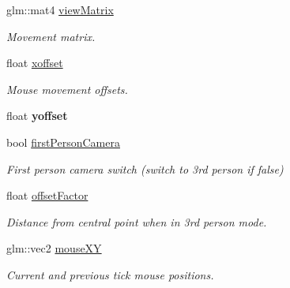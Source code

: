 \begin{DoxyCompactItemize}
\mbox{\label{class_camera_component_aa9ba12dfc1a9b7b06bf79fdb0a91a3e2}} 
glm\+::mat4 \mbox{\hyperlink{class_camera_component_aa9ba12dfc1a9b7b06bf79fdb0a91a3e2}{view\+Matrix}}
\begin{DoxyCompactList}\small\item\em Movement matrix. \end{DoxyCompactList}\item 
\mbox{\label{class_camera_component_a385f35e4c5d616580e0bd4ded5c4653f}} 
float \mbox{\hyperlink{class_camera_component_a385f35e4c5d616580e0bd4ded5c4653f}{xoffset}}
\begin{DoxyCompactList}\small\item\em Mouse movement offsets. \end{DoxyCompactList}\item 
\mbox{\label{class_camera_component_aac7aad40b74b70920b8b5d214550fe91}} 
float {\bfseries yoffset}
\item 
\mbox{\label{class_camera_component_ac1d3fbcc4d2d4a0f079339a238798cd8}} 
bool \mbox{\hyperlink{class_camera_component_ac1d3fbcc4d2d4a0f079339a238798cd8}{first\+Person\+Camera}}
\begin{DoxyCompactList}\small\item\em First person camera switch (switch to 3rd person if false) \end{DoxyCompactList}\item 
\mbox{\label{class_camera_component_a8d1632f720f6478ceb2c146aee4a35b1}} 
float \mbox{\hyperlink{class_camera_component_a8d1632f720f6478ceb2c146aee4a35b1}{offset\+Factor}}
\begin{DoxyCompactList}\small\item\em Distance from central point when in 3rd person mode. \end{DoxyCompactList}\item 
\mbox{\label{class_camera_component_a92d8a306e8b05c1bde2deecb4ae5e1f9}} 
glm\+::vec2 \mbox{\hyperlink{class_camera_component_a92d8a306e8b05c1bde2deecb4ae5e1f9}{mouse\+XY}}
\begin{DoxyCompactList}\small\item\em Current and previous tick mouse positions. \end{DoxyCompactList}\item 

\end{DoxyCompactItemize}
